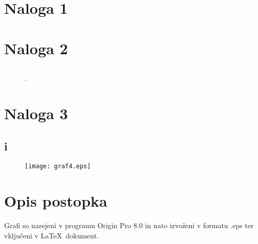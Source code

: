 \documentclass{article}
\title{}
\author{Jan Šuntajs 28120080}
\date{}
\begin{document}
  \maketitle
  
\section* {Naloga 1}
{\subsection*{}}



	\begin{figure}[htpb]
\centering{
\texttt{[image: ]}}
\caption{}
\label{}
\end{figure}

\pagebreak


\section* {Naloga 2}

{\subsection*{}}


	\begin{figure}[htpb]
\caption{.}
\label{}
\end{figure}
\pagebreak

\section* {Naloga 3}

 {\subsection*{i}}



	\begin{figure}[ht]
\caption{}
\label{}
\end{figure}

\clearpage
	\begin{figure}[htp]

\begin{center}
\texttt{[image: graf4.eps]}
\caption{}
\label{}
\end{center}
\end{figure}

\section*{Opis postopka}

Grafi so narejeni v programu Origin Pro 8.0 in nato izvoženi v formatu .eps ter vključeni v \LaTeX \ dokument.


  
  
\end{document}
